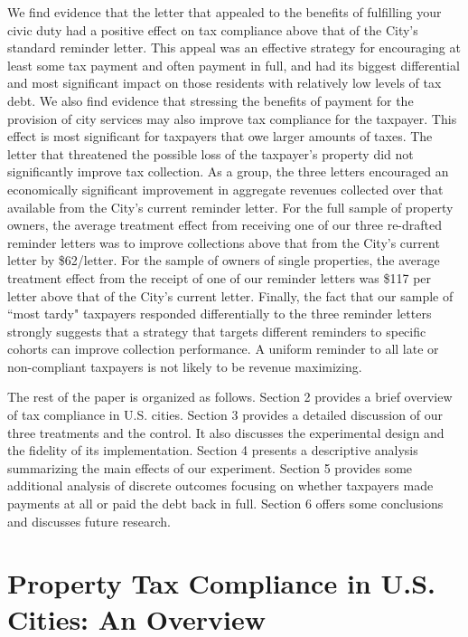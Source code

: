 \documentclass[12pt,titlepage]{article}
\begin{document}
We find evidence that the letter that appealed to the benefits of
fulfilling your civic duty had a positive effect on tax compliance
above that of the City's standard reminder letter.  This appeal was an
effective strategy for encouraging at least some tax payment and often
payment in full, and had its biggest differential and most significant
impact on those residents with relatively low levels of tax debt.  We
also find evidence that stressing the benefits of payment for the
provision of city services may also improve tax compliance for the
taxpayer.  This effect is most significant for taxpayers that owe
larger amounts of taxes. The letter that threatened the possible loss
of the taxpayer's property did not significantly improve tax
collection.  As a group, the three letters encouraged an economically
significant improvement in aggregate revenues
collected over that available from the City's current reminder letter.
For the full sample of property owners, the average treatment effect
from receiving one of our three re-drafted reminder letters was to
improve collections above that from the City's current letter by
\$62/letter.  For the sample of owners of single properties, the
average treatment effect from the receipt of one of our reminder
letters was \$117 per letter above that of the City's current letter.
Finally, the fact that our sample of ``most tardy" taxpayers responded
differentially to the three reminder letters strongly suggests that a
strategy that targets different reminders to specific cohorts can
improve collection performance.  A uniform reminder to all late or
non-compliant taxpayers is not likely to be revenue maximizing.

The rest of the paper is organized as follows.  Section 2 provides a
brief overview of tax compliance in U.S. cities. Section 3 provides
a detailed discussion of our three treatments and the control. It also
discusses the experimental design and the fidelity of its
implementation. Section 4 presents a descriptive analysis summarizing
the main effects of our experiment.  Section 5 provides some additional
analysis of discrete outcomes focusing on whether taxpayers made 
payments at all or paid the debt back in full.
Section 6 offers some conclusions and discusses future research.


\section{Property Tax Compliance in U.S. Cities: An Overview}
\end{document}
